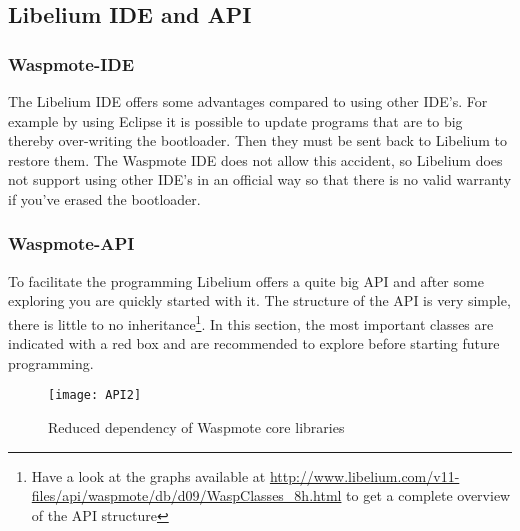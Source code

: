 \subsection{Libelium IDE and API}
\subsubsection{Waspmote-IDE}
The Libelium IDE offers some advantages compared to using other IDE's. For example by using Eclipse it is possible to update programs that are to big thereby over-writing the bootloader. Then they must be sent back to Libelium to restore them. The Waspmote IDE does not allow this accident, so Libelium does not support using other IDE's in an official way so that there is no valid warranty if you've erased the bootloader.\\
\subsubsection{Waspmote-API}
\label{LibAPI}
To facilitate the programming Libelium offers a quite big API and after some exploring you are quickly started with it. The structure of the API is very simple, there is little to no inheritance\footnote{Have a look at the graphs available at \url{http://www.libelium.com/v11-files/api/waspmote/db/d09/WaspClasses_8h.html} to get a complete overview of the API structure}. In this section, the most important classes are indicated with a red box and are recommended to explore before starting future programming.
\begin{figure*}[htbp]
\centering
\texttt{[image: API2]}
\caption{Reduced dependency of Waspmote core libraries}
\label{fig:API2}
\end{figure*}
